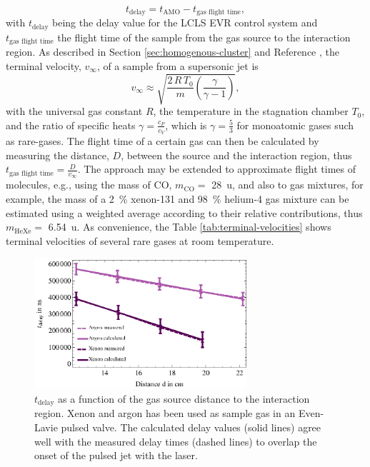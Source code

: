 \begin{equation}
t_{\text{delay}} = t_{\text{AMO}} - t_{\text{gas flight time}},
\label{eqn:sample-jet-delay-time}
\end{equation}
with $t_{\text{delay}}$ being the delay value for the LCLS EVR control system and $t_{\text{gas flight time}}$ the flight time of the sample from the gas source to the interaction region. As described in Section \ref{sec:homogenous-cluster} and Reference \citep{Miller-1988-Oxford}, the terminal velocity, $v_{\infty}$, of a sample from a supersonic jet is
\begin{equation}
 v_{\infty} \approx \sqrt{\frac{2\, R\, T_{0}}{m} \left(\frac{\gamma}{\gamma - 1}\right)},
\label{eqn:terminal-velocity}
\end{equation}
with the universal gas constant $R$, the temperature in the stagnation chamber $T_{0}$, and the ratio of specific heats $\gamma = \frac{c_{P}}{c_{V}}$, which is $\gamma = \frac{5}{3}$ for monoatomic gases such as rare-gases. The flight time of a certain gas can then be calculated by measuring the distance, $D$, between the source and the interaction region, thus $t_{\text{gas flight time}}=\frac{D}{v_{\infty}}$. The approach may be extended to approximate flight times of molecules, e.g., using the mass of CO, $m_{\text{CO}}=$ \SI{28}{\amu}, and also to gas mixtures, for example, the mass of a \SI{2}{\percent} xenon-131 and \SI{98}{\percent} helium-4 gas mixture can be estimated using a weighted average according to their relative contributions, thus  $m_{\text{HeXe}} =$ \SI{6.54}{\amu}. As convenience, the Table \ref{tab:terminal-velocities} shows terminal velocities of several rare gases at room temperature.\\[1\baselineskip]
\begin{figure}
	\centering
		\includegraphics[width=0.70\textwidth]{images/gas-jet-flight-times.eps}
	\caption[Event receiver time delay at LCLS for supersonic gas jets.]{$t_{\text{delay}}$ as a function of the gas source distance to the interaction region. Xenon and argon has been used as sample gas in an Even-Lavie pulsed valve. The calculated delay values (solid lines) agree well with the measured delay times (dashed lines) to overlap the onset of the pulsed jet with the laser.}
	\label{fig:LCLS-delay-data}
\end{figure}
